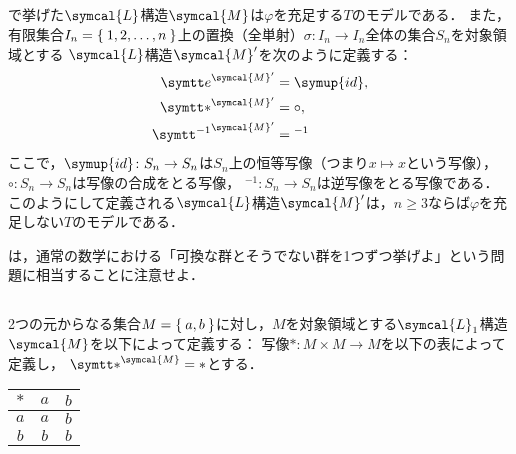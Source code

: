 \subsection*{}

で挙げた\(\symcal{L}\)構造\(\symcal{M}\)は\(\varphi\)を充足する\(T\)のモデルである．
また，有限集合\(I_n = \Set{1, 2, \dots, n}\)上の置換（全単射）\(\sigma \colon I_n \to I_n\)全体の集合\(S_n\)を対象領域とする
\(\symcal{L}\)構造\(\symcal{M}'\)を次のように定義する：
\begin{align*}
	\interpretation{\symcal{M}'}{\obj{e}}       & = \symup{id}, \\
	\interpretation{\symcal{M}'}{\obj{\ast}}    & = \circ,      \\
	\interpretation{\symcal{M}'}{\obj{{}^{-1}}} & = {}^{-1}
\end{align*}
ここで，\(\symup{id} \colon S_n \to S_n\)は\(S_n\)上の恒等写像（つまり\(x \mapsto x\)という写像），
\(\circ \colon S_n \to S_n\)は写像の合成をとる写像，
\({}^{-1} \colon S_n \to S_n\)は逆写像をとる写像である．
このようにして定義される\(\symcal{L}\)構造\(\symcal{M}'\)は，\(n \geq 3\)ならば\(\varphi\)を充足しない\(T\)のモデルである．

は，通常の数学における「可換な群とそうでない群を1つずつ挙げよ」という問題に相当することに注意せよ．

\subsection*{}

2つの元からなる集合\(M = \Set{a, b}\)に対し，\(M\)を対象領域とする\(\symcal{L}_1\)構造\(\symcal{M}\)を以下によって定義する：
写像\(\mathord{\ast} \colon M \times M \to M\)を以下の表によって定義し，
\(\interpretation{\symcal{M}}{\obj{\ast}} = \mathord{\ast}\)とする．
\begin{table}[htbp]
	\centering
	\begin{tabular}{c|cc}
		\(\ast\) & \(a\) & \(b\) \\ \hline
		\(a\)    & \(a\) & \(b\) \\
		\(b\)    & \(b\) & \(b\) \\
	\end{tabular}
\end{table}

